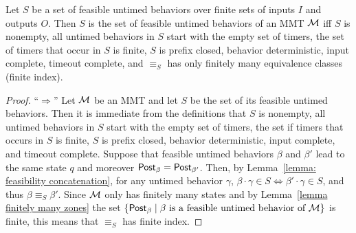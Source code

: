 \begin{theorem}
\label{Nerode theorem}
Let $S$ be a set of feasible untimed behaviors over finite sets of inputs $I$ and outputs $O$.
Then $S$ is the set of feasible untimed behaviors of an MMT ${\cal M}$ iff $S$ is nonempty, all untimed behaviors in $S$
start with the empty set of timers, the set of timers that occur in $S$ is finite,
$S$ is prefix closed, behavior deterministic, input complete, timeout complete,
and $\equiv_S$ has only finitely many equivalence classes (finite index).
\end{theorem}
\begin{proof}

``$\Rightarrow$'' Let ${\cal M}$ be an MMT and let $S$ be the set of its feasible untimed behaviors.
Then it is immediate from the definitions that $S$ is nonempty, all untimed behaviors in $S$
start with the empty set of timers, the set if timers that occurs in $S$ is finite,
$S$ is prefix closed, behavior deterministic, input complete, and timeout complete.
Suppose that feasible untimed behaviors $\beta$ and $\beta'$ lead to the same state $q$ and moreover $\mathsf{Post}_{\beta} = \mathsf{Post}_{\beta'}$.
Then, 
by Lemma~\ref{lemma: feasibility concatenation},
for any untimed behavior $\gamma$, $\beta \cdot \gamma \in S \Leftrightarrow \beta' \cdot \gamma \in S$, and thus
$\beta \equiv_S \beta'$.
Since ${\cal M}$ only has finitely many states and by Lemma~\ref{lemma finitely many zones} the set
$\{ \mathsf{Post}_{\beta} \mid \beta \mbox{ is a feasible untimed behavior of } {\cal M} \}$ is finite, this means that
$\equiv_S$ has finite index.


\end{proof}

